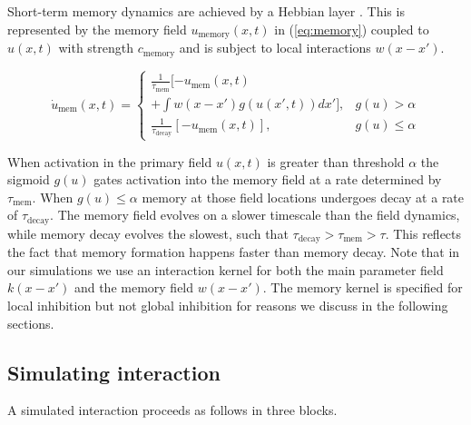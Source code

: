 \documentclass[10pt,letterpaper]{article}
\begin{document}
Short-term memory dynamics are achieved by a Hebbian layer \citep{samuelson-etal2011}. This is represented by the memory field $u_{\text{memory}}(x,t)$ in (\ref{eq:memory}) coupled to $u(x,t)$ with strength $c_{\text{memory}}$ and is subject to local interactions $w(x-x')$.

\begin{equation}
\dot{u}_{\text{mem}}(x,t)  =
\begin{cases} 
    \frac{1}{\tau_{\text{mem}}} [-u_{\text{mem}}(x,t) \\
    + \int w(x-x') g(u(x',t)) dx'], 
    & g(u) > \alpha \\[1em]
    \frac{1}{\tau_{\text{decay}}} [-u_{\text{mem}}(x,t)], 
    & g(u) \leq \alpha
\end{cases}
\label{eq:memory}
\end{equation}

When activation in the primary field $u(x,t)$ is greater than threshold $\alpha$ the sigmoid $g(u)$ gates activation into the memory field at a rate determined by $\tau_{\text{mem}}$. When $g(u) \leq \alpha$ memory at those field locations undergoes decay at a rate of $\tau_{\text{decay}}$. The memory field evolves on a slower timescale than the field dynamics, while memory decay evolves the slowest, such that $ \tau_{\text{decay}} > \tau_{\text{mem}} > \tau$. This reflects the fact that memory formation happens faster than memory decay. Note that in our simulations we use an interaction kernel for both the main parameter field $k(x-x')$ and the memory field $w(x-x')$. The memory kernel is specified for local inhibition but not global inhibition for reasons we discuss in the following sections.


\subsection{Simulating interaction}

A simulated interaction proceeds as follows in three blocks.
\end{document}

